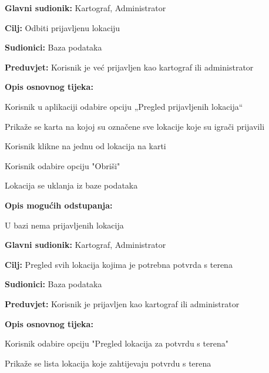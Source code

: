 \noindent {}
\begin{packed_item}
	
	\item \textbf{Glavni sudionik: }Kartograf, Administrator
	\item  \textbf{Cilj:} Odbiti prijavljenu lokaciju
	\item  \textbf{Sudionici:} Baza podataka
	\item  \textbf{Preduvjet:} Korisnik je već prijavljen kao kartograf ili administrator
	\item  \textbf{Opis osnovnog tijeka:}
	
	\item[] \begin{packed_enum}
		
		\item Korisnik u aplikaciji odabire opciju „Pregled prijavljenih lokacija“
		\item Prikaže se karta na kojoj su označene sve lokacije koje su igrači prijavili
		\item Korisnik klikne na jednu od lokacija na karti
		\item Korisnik odabire opciju "Obriši"
		\item Lokacija se uklanja iz baze podataka
	\end{packed_enum}
	
	\item  \textbf{Opis mogućih odstupanja:}
	
	\item[] \begin{packed_item}
		
		\item[3.a]  U bazi nema prijavljenih lokacija
		
	\end{packed_item}
\end{packed_item}

\noindent {}
\begin{packed_item}
	
	\item \textbf{Glavni sudionik: }Kartograf, Administrator
	\item  \textbf{Cilj:} Pregled svih lokacija kojima je potrebna potvrda s terena
	\item  \textbf{Sudionici:} Baza podataka
	\item  \textbf{Preduvjet:} Korisnik je prijavljen kao kartograf ili administrator
	\item  \textbf{Opis osnovnog tijeka:}
	
	\item[] \begin{packed_enum}
		
		\item Korisnik odabire opciju "Pregled lokacija za potvrdu s terena"
		\item Prikaže se lista lokacija koje zahtijevaju potvrdu s terena
	\end{packed_enum}
\end{packed_item}



